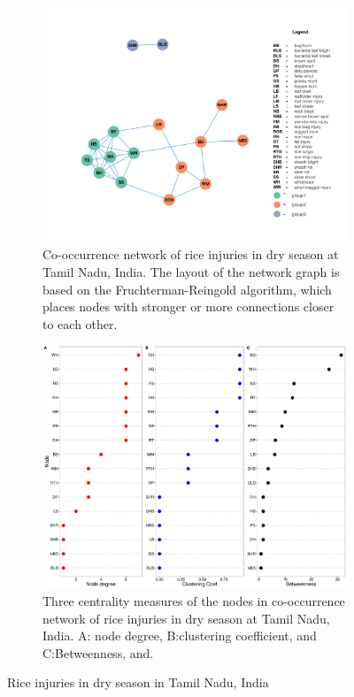 \begin{figure}
    \centering
    \begin{subfigure}[b]{1\textwidth}
        \includegraphics[width = 1\textwidth]{figures/networkTM_ds/networkTM_ds.pdf}
        \caption{Co-occurrence network of rice injuries in dry season at Tamil Nadu, India. The layout of the network graph is based on the Fruchterman-Reingold algorithm, which places nodes with stronger or more connections closer to each other.}
        \label{fig:networkTM_ds}
    \end{subfigure}
    \begin{subfigure}[b]{1\textwidth}
        \includegraphics[width = 1\textwidth]{figures/nodepropTM_ds/nodepropTM_ds.pdf}
        \caption{Three centrality measures of the nodes in co-occurrence network of rice injuries in dry season at Tamil Nadu, India. A: node degree, B:clustering coefficient, and C:Betweenness, and.}
        \label{fig:nodepropTM_ds}
    \end{subfigure}
    \caption{Rice injuries in dry season in Tamil Nadu, India}
    \label{fig:TM_ds}
\end{figure}

